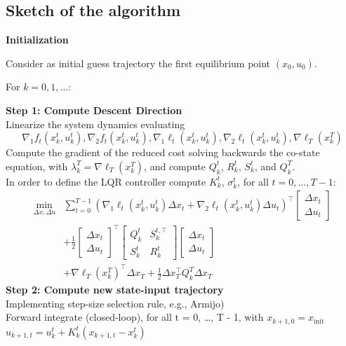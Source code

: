 \subsection{Sketch of the algorithm}
\textbf{Initialization}\vspace{8pt}

Consider as initial guess trajectory the first equilibrium point $(x_0, u_0)$.

For $k = 0, 1, \ldots$:\vspace{8pt}

\textbf{Step 1: Compute Descent Direction}\vspace{8pt} \\
Linearize the system dynamics evaluating 
\[\nabla_1 f_t(x_k^t, u_k^t), \nabla_2 f_t(x_k^t, u_k^t), \nabla_1 \ell_t(x_k^t, u_k^t), \nabla_2 \ell_t(x_k^t, u_k^t), \nabla \ell_T(x_k^T)\] 
Compute the gradient of the reduced cost solving backwards the co-state equation, with $\lambda_k^T = \nabla \ell_T(x_k^T)$, and compute $Q_k^t$, $R_k^t$, $S_k^t$, and $Q_k^T$. \vspace{8pt}\\
In order to define the LQR controller compute $K_k^t$, $\sigma_k^t$, for all $t = 0, \ldots, T - 1$:
\begin{align*}
\min_{\Delta x, \Delta u} &\sum_{t=0}^{T-1} \left( \nabla_1 \ell_t(x_k^t, u_k^t) \Delta x_t + \nabla_2 \ell_t(x_k^t, u_k^t) \Delta u_t \right)^\top \begin{bmatrix} \Delta x_t \\ \Delta u_t \end{bmatrix} \\
&+ \frac{1}{2} \begin{bmatrix} \Delta x_t \\ \Delta u_t \end{bmatrix}^\top \begin{bmatrix} Q_k^t & S_k^{t,\top} \\ S_k^t & R_k^t \end{bmatrix} \begin{bmatrix} \Delta x_t \\ \Delta u_t \end{bmatrix} \\
&+ \nabla \ell_T(x_k^T)^\top \Delta x_T + \frac{1}{2} \Delta x_T^\top Q_k^T \Delta x_T
\end{align*}
\textbf{Step 2: Compute new state-input trajectory}\vspace{8pt} \\
Implementing step-size selection rule, e.g., Armijo) \\
Forward integrate (closed-loop), for all  t = 0, \ldots, T - 1,  with  $x_{k+1,0} = x_{\text{init}}$ \vspace{8pt}\\
$u_{k+1,t} = u_k^t + K_k^t (x_{k+1,t} - x_k^t)$

